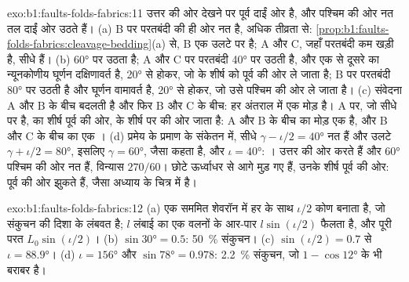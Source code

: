 \begin{solution}{exo:b1:faults-folds-fabrics:11}
उत्तर की ओर देखने पर पूर्व दाईं ओर है, और पश्चिम की ओर नत तल दाईं ओर उठते हैं। (a) B पर परतबंदी  की ही ओर नत है, अधिक तीव्रता से: \cref{prop:b1:faults-folds-fabrics:cleavage-bedding}(a) से, B एक उलटे  पर है; A और C, जहाँ परतबंदी कम खड़ी है, सीधे हैं। (b)  \ang{60} पर उठता है; A और C पर परतबंदी \ang{40} पर उठती है, और एक से दूसरे का न्यूनकोणीय घूर्णन दक्षिणावर्त है, \ang{20} से होकर, जो  के शीर्ष को पूर्व की ओर ले जाता है; B पर परतबंदी \ang{80} पर उठती है और घूर्णन वामावर्त है, \ang{20} से होकर, जो उसे पश्चिम की ओर ले जाता है। (c) संवेदना A और B के बीच बदलती है और फिर B और C के बीच: हर अंतराल में एक मोड़ है। A पर, जो सीधे  पर है,  का शीर्ष पूर्व की ओर,  के शीर्ष पर  की ओर जाता है: A और B के बीच का मोड़ एक  है, और B और C के बीच का एक । (d) प्रमेय के प्रमाण के संकेतन में, सीधे  $\gamma - \iota/2 = \ang{40}$ नत हैं और उलटे  $\gamma + \iota/2 =
\ang{80}$, इसलिए $\gamma = \ang{60}$, जैसा  कहता है, और $\iota =
\ang{40}$: ।  उत्तर की ओर  करते हैं और \ang{60} पश्चिम की ओर नत हैं, विन्यास $270/60$। छोटे  ऊर्ध्वाधर से आगे मुड़ गए हैं, उनके शीर्ष पूर्व की ओर:  पूर्व की ओर झुकते हैं, जैसा अध्याय के चित्र में है।
\end{solution}

\begin{solution}{exo:b1:faults-folds-fabrics:12}
(a) एक सममित शेवरॉन  में हर   के साथ $\iota/2$ कोण बनाता है, जो संकुचन की दिशा के लंबवत है; $l$ लंबाई का एक  वलनों के आर-पार $l\sin(\iota/2)$ फैलता है, और पूरी परत $L_0\sin(\iota/2)$। (b) $\sin\ang{30} = 0.5$: \qty{50}{\percent} संकुचन। (c) $\sin(\iota/2) = 0.7$ से $\iota = \ang{88.9}$। (d) $\iota = \ang{156}$ और $\sin\ang{78} = 0.978$: \qty{2.2}{\percent} संकुचन, जो $1 - \cos\ang{12}$ के भी बराबर है।
\end{solution}

